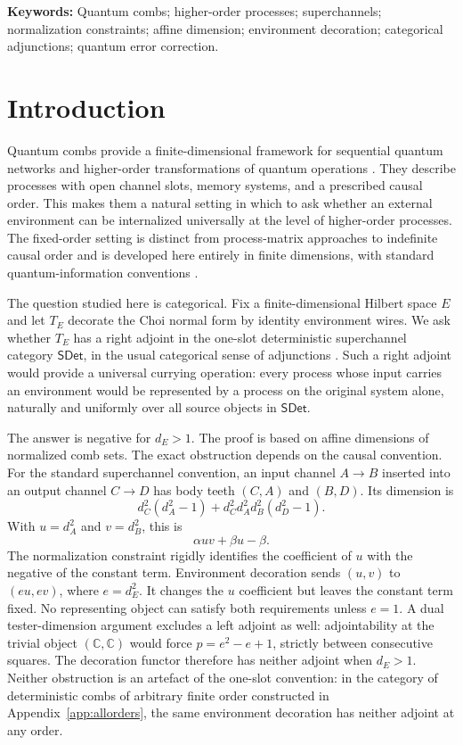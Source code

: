 \documentclass[11pt,a4paper]{article}
\theoremstyle{definition}
\theoremstyle{plain}
\theoremstyle{remark}
\newcommand{\SDet}{\mathsf{SDet}}
\newcommand{\keywords}{\noindent\textbf{Keywords:} Quantum combs; higher-order processes; superchannels; normalization constraints; affine dimension; environment decoration; categorical adjunctions; quantum error correction.}
\begin{document}
\keywords

\section{Introduction}

Quantum combs provide a finite-dimensional framework for sequential quantum networks and higher-order transformations of quantum operations \cite{chiribella2008,chiribella2009,chiribella2013}. They describe processes with open channel slots, memory systems, and a prescribed causal order. This makes them a natural setting in which to ask whether an external environment can be internalized universally at the level of higher-order processes. The fixed-order setting is distinct from process-matrix approaches to indefinite causal order \cite{oreshkov2012} and is developed here entirely in finite dimensions, with standard quantum-information conventions \cite{watrous2018}.

The question studied here is categorical. Fix a finite-dimensional Hilbert space $E$ and let $T_E$ decorate the Choi normal form by identity environment wires. We ask whether $T_E$ has a right adjoint in the one-slot deterministic superchannel category $\SDet$, in the usual categorical sense of adjunctions \cite{macLane1998}. Such a right adjoint would provide a universal currying operation: every process whose input carries an environment would be represented by a process on the original system alone, naturally and uniformly over all source objects in $\SDet$.

The answer is negative for $d_E>1$. The proof is based on affine dimensions of normalized comb sets. The exact obstruction depends on the causal convention. For the standard superchannel convention, an input channel $A\to B$ inserted into an output channel $C\to D$ has body teeth $(C,A)$ and $(B,D)$. Its dimension is
\[
 d_C^2(d_A^2-1)+d_C^2d_A^2d_B^2(d_D^2-1).
\]
With $u=d_A^2$ and $v=d_B^2$, this is
\[
 \alpha uv+\beta u-\beta.
\]
The normalization constraint rigidly identifies the coefficient of $u$ with the negative of the constant term. Environment decoration sends $(u,v)$ to $(eu,ev)$, where $e=d_E^2$. It changes the $u$ coefficient but leaves the constant term fixed. No representing object can satisfy both requirements unless $e=1$. A dual tester-dimension argument excludes a left adjoint as well: adjointability at the trivial object $(\mathbb C,\mathbb C)$ would force $p=e^2-e+1$, strictly between consecutive squares. The decoration functor therefore has
neither adjoint when $d_E>1$. Neither obstruction is an artefact of the
one-slot convention: in the category of deterministic combs of
arbitrary finite order constructed in Appendix~\ref{app:allorders},
the same environment decoration has neither adjoint at any order.
\end{document}
